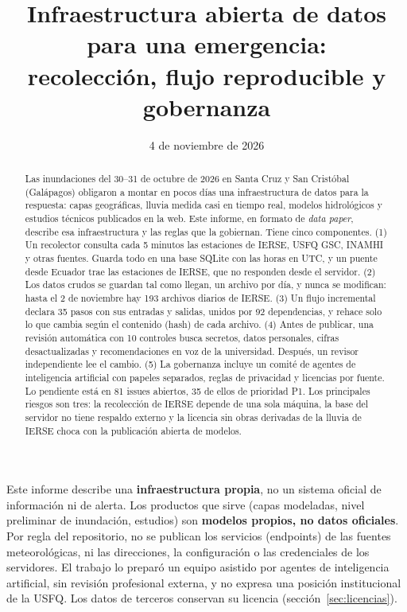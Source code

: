 \documentclass{sosg-informe}
\title{Infraestructura abierta de datos para una emergencia:\\recolección, flujo reproducible y gobernanza}
\date{4 de noviembre de 2026}
\begin{document}
\maketitle

\begin{abstract}
Las inundaciones del 30--31 de octubre de 2026 en Santa Cruz y San Cristóbal (Galápagos) obligaron a montar en pocos días una infraestructura de datos para la respuesta: capas geográficas, lluvia medida casi en tiempo real, modelos hidrológicos y estudios técnicos publicados en la web. Este informe, en formato de \emph{data paper}, describe esa infraestructura y las reglas que la gobiernan. Tiene cinco componentes. (1) Un recolector consulta cada 5 minutos las estaciones de IERSE, USFQ GSC, INAMHI y otras fuentes. Guarda todo en una base SQLite con las horas en UTC, y un puente desde Ecuador trae las estaciones de IERSE, que no responden desde el servidor. (2) Los datos crudos se guardan tal como llegan, un archivo por día, y nunca se modifican: hasta el 2 de noviembre hay 193 archivos diarios de IERSE. (3) Un flujo incremental declara 35 pasos con sus entradas y salidas, unidos por 92 dependencias, y rehace solo lo que cambia según el contenido (hash) de cada archivo. (4) Antes de publicar, una revisión automática con 10 controles busca secretos, datos personales, cifras desactualizadas y recomendaciones en voz de la universidad. Después, un revisor independiente lee el cambio. (5) La gobernanza incluye un comité de agentes de inteligencia artificial con papeles separados, reglas de privacidad y licencias por fuente. Lo pendiente está en 81 issues abiertos, 35 de ellos de prioridad P1. Los principales riesgos son tres: la recolección de IERSE depende de una sola máquina, la base del servidor no tiene respaldo externo y la licencia sin obras derivadas de la lluvia de IERSE choca con la publicación abierta de modelos.
\end{abstract}

\begin{aviso}
Este informe describe una \textbf{infraestructura propia}, no un sistema oficial de información ni de alerta. Los productos que sirve (capas modeladas, nivel preliminar de inundación, estudios) son \textbf{modelos propios, no datos oficiales}. Por regla del repositorio, no se publican los servicios (endpoints) de las fuentes meteorológicas, ni las direcciones, la configuración o las credenciales de los servidores. El trabajo lo preparó un equipo asistido por agentes de inteligencia artificial, sin revisión profesional externa, y no expresa una posición institucional de la USFQ. Los datos de terceros conservan su licencia (sección~\ref{sec:licencias}).
\end{aviso}
\end{document}
